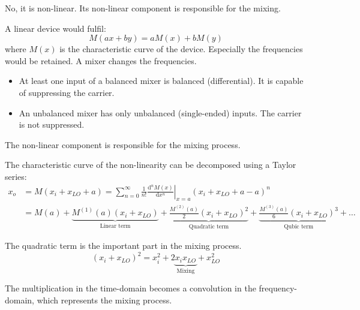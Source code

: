 \begin{solution}
	\begin{tasks}
		\task
		No, it is non-linear. Its non-linear component is responsible for the mixing.
		
		A linear device would fulfil:
		\begin{equation*}
			M\left(a x + b y\right) = a M(x) + b M(y)
		\end{equation*}
		where $M(x)$ is the characteristic curve of the device. Especially the frequencies would be retained. A mixer changes the frequencies.
		
		\task
		\begin{itemize}
			\item At least one input of a balanced mixer is balanced (differential). It is capable of suppressing the carrier.
			\item An unbalanced mixer has only unbalanced (single-ended) inputs. The carrier is not suppressed.
		\end{itemize}
	
		\task
		The non-linear component is responsible for the mixing process.
		
		The characteristic curve of the non-linearity can be decomposed using a Taylor series:
		\begin{equation*}
			\begin{split}
				x_{o} &= M(x_{i} + x_{LO} + a) = \sum\limits_{n=0}^{\infty} \frac{1}{n!} \left.\frac{\mathrm{d}^n M(x)}{\mathrm{d} x^n}\right|_{x=a} \left(x_{i} + x_{LO} + a - a\right)^n \\
				 &= M(a) + \underbrace{M^{(1)}(a) \left(x_{i} + x_{LO}\right)}_{\text{Linear term}} + \underbrace{\frac{M^{(2)}(a)}{2} \left(x_{i} + x_{LO}\right)^2}_{\text{Quadratic term}} + \underbrace{\frac{M^{(3)}(a)}{6} \left(x_{i} + x_{LO}\right)^3}_{\text{Qubic term}} + \dots
				\end{split}
		\end{equation*}
		
		The quadratic term is the important part in the mixing process.
		\begin{equation*}
			\left(x_{i} + x_{LO}\right)^2 = x_{i}^2 + 2 \underbrace{x_{i} x_{LO}}_{\text{Mixing}} + x_{LO}^2
		\end{equation*}
		
		The multiplication in the time-domain becomes a convolution in the frequency-domain, which represents the mixing process.
	\end{tasks}
\end{solution}

